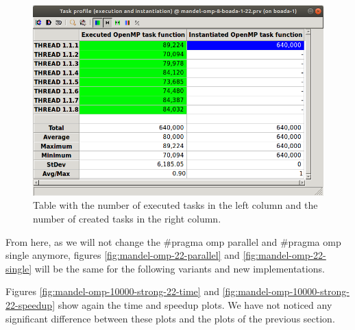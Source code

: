 \documentclass[12pt, a4paper]{article}
\begin{document}
\begin{figure}[H]
	\centering
	\includegraphics[scale=0.40]{./S2_OMP_tasks_table_22}
	\caption{Table with the number of executed tasks in the left column and the number of created tasks in the right column.}
	\label{fig:S2_OMP_tasks_table_22}
\end{figure}

From here, as we will not change the \#pragma omp parallel and \#pragma omp single anymore, figures \ref{fig:mandel-omp-22-parallel} and \ref{fig:mandel-omp-22-single} will be the same for the following variants and new implementations.

Figures \ref{fig:mandel-omp-10000-strong-22-time} and \ref{fig:mandel-omp-10000-strong-22-speedup} show again the time and speedup plots. We have not noticed any significant difference between these plots and the plots of the previous section.
\end{document}
